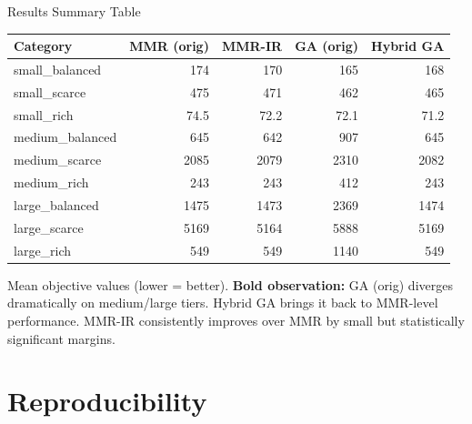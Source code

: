 \documentclass[aspectratio=43,8pt]{beamer}
\begin{document}
\begin{frame}{Results Summary Table}
\begin{table}[h]
\centering
\small
\begin{tabular}{lrrrr}
\toprule
\textbf{Category} & \textbf{MMR (orig)} & \textbf{MMR-IR} & \textbf{GA (orig)} & \textbf{Hybrid GA} \\
\midrule
small\_balanced & 174 & 170 & 165 & 168 \\
small\_scarce & 475 & 471 & 462 & 465 \\
small\_rich & 74.5 & 72.2 & 72.1 & 71.2 \\
\midrule
medium\_balanced & 645 & 642 & 907 & 645 \\
medium\_scarce & 2085 & 2079 & 2310 & 2082 \\
medium\_rich & 243 & 243 & 412 & 243 \\
\midrule
large\_balanced & 1475 & 1473 & 2369 & 1474 \\
large\_scarce & 5169 & 5164 & 5888 & 5169 \\
large\_rich & 549 & 549 & 1140 & 549 \\
\bottomrule
\end{tabular}
\end{table}

\vspace{0.2cm}
{\footnotesize Mean objective values (lower = better). \textbf{Bold observation:} GA (orig) diverges dramatically on medium/large tiers. Hybrid GA brings it back to MMR-level performance. MMR-IR consistently improves over MMR by small but statistically significant margins.}
\end{frame}

\section{Reproducibility}
\end{document}
